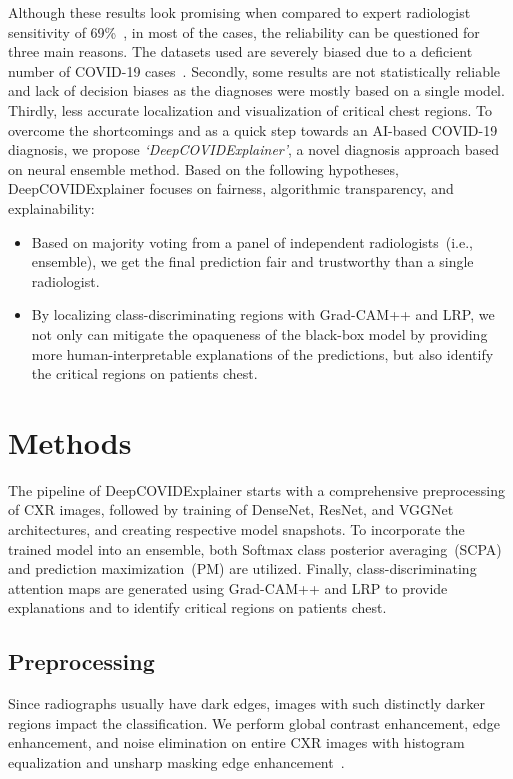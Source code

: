 \documentclass[conference]{IEEEtran}
\begin{document}
Although these results look promising when compared to expert radiologist sensitivity of 69\%~\cite{tabik2020covidgr}, in most of the cases, the reliability can be questioned for three main reasons. The datasets used are severely biased due to a deficient number of COVID-19 cases~\cite{tabik2020covidgr}. Secondly, some results are not statistically reliable and lack of decision biases as the diagnoses were mostly based on a single model. Thirdly, less accurate localization and visualization of critical chest regions.
\fi 
To overcome the shortcomings and as a quick step towards an AI-based COVID-19 diagnosis, we propose \emph{`DeepCOVIDExplainer'}, a novel diagnosis approach based on neural ensemble method. 
Based on the following hypotheses, DeepCOVIDExplainer focuses on fairness, algorithmic transparency, and explainability:

\begin{itemize}
    \item Based on majority voting from a panel of independent radiologists~(i.e., ensemble), we get the final prediction fair and trustworthy than a single radiologist.
    \item By localizing class-discriminating regions with Grad-CAM++ and LRP, we not only can mitigate the opaqueness of the black-box model by providing more human-interpretable explanations of the predictions, but also identify the critical regions on patients chest.
\end{itemize}

\section{Methods}
\label{sec:mm}
The pipeline of DeepCOVIDExplainer starts with a comprehensive preprocessing of CXR images, followed by training of DenseNet, ResNet, and VGGNet architectures, and creating respective model snapshots. To incorporate the trained model into an ensemble, both Softmax class posterior averaging~(SCPA) and prediction maximization~(PM) are utilized. Finally, class-discriminating attention maps are generated using Grad-CAM++ and LRP to provide explanations and to identify critical regions on patients chest.

\subsection{Preprocessing}
Since radiographs usually have dark edges, images with such distinctly darker regions impact the  classification. 
We perform global contrast enhancement, edge enhancement, and noise elimination on entire CXR images with histogram equalization and unsharp masking edge enhancement~\cite{86}. %
\end{document}

